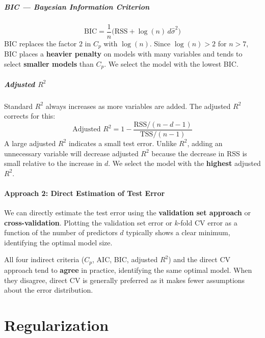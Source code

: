 \documentclass[11pt,a4paper]{article}
\theoremstyle{definition}
\theoremstyle{plain}
\theoremstyle{remark}
\begin{document}
\subsubsection{BIC — Bayesian Information Criterion}

\[
    \mathrm{BIC} = \frac{1}{n}\bigl(\mathrm{RSS} + \log(n)\,d\hat{\sigma}^2\bigr)
\]
BIC replaces the factor $2$ in $C_p$ with $\log(n)$. Since $\log(n) > 2$ for $n > 7$, BIC places a \textbf{heavier penalty} on models with many variables and tends to select \textbf{smaller models} than $C_p$. We select the model with the lowest BIC.

\subsubsection{Adjusted \texorpdfstring{$R^2$}{R2}}

Standard $R^2$ always increases as more variables are added. The adjusted $R^2$ corrects for this:
\[
    \text{Adjusted } R^2 = 1 - \frac{\mathrm{RSS}/(n - d - 1)}{\mathrm{TSS}/(n-1)}
\]
A large adjusted $R^2$ indicates a small test error. Unlike $R^2$, adding an unnecessary variable will decrease adjusted $R^2$ because the decrease in RSS is small relative to the increase in $d$. We select the model with the \textbf{highest} adjusted $R^2$.

\subsection{Approach 2: Direct Estimation of Test Error}

We can directly estimate the test error using the \textbf{validation set approach} or \textbf{cross-validation}. Plotting the validation set error or $k$-fold CV error as a function of the number of predictors $d$ typically shows a clear minimum, identifying the optimal model size.

\begin{tcolorbox}[colback=green!5!white,colframe=green!75!black]
All four indirect criteria ($C_p$, AIC, BIC, adjusted $R^2$) and the direct CV approach tend to \textbf{agree} in practice, identifying the same optimal model. When they disagree, direct CV is generally preferred as it makes fewer assumptions about the error distribution.
\end{tcolorbox}


\part{Regularization}
\end{document}
